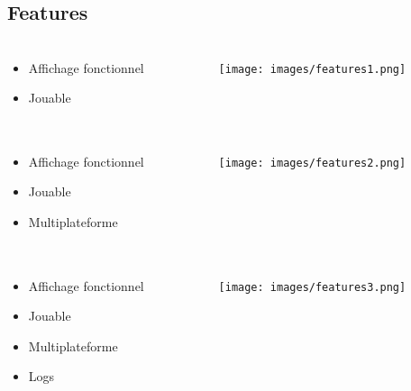 \documentclass{beamer}
\begin{document}
\subsection{Features}
\begin{frame}
	\frametitle{\secname}
  \framesubtitle{\subsecname}
  \begin{columns}[T]
		\begin{column}{.50\textwidth}
      \begin{itemize}
        \item Affichage fonctionnel
        \item Jouable
      \end{itemize}
		\end{column}
    \begin{column}{.50\textwidth}
			\begin{figure}
				\texttt{[image: images/features1.png]}
			\end{figure}
		\end{column}
	\end{columns}
\end{frame}
\begin{frame}
	\frametitle{\secname}
  \framesubtitle{\subsecname}
  \begin{columns}[T]
		\begin{column}{.50\textwidth}
      \begin{itemize}
        \item Affichage fonctionnel
        \item Jouable
        \item Multiplateforme
      \end{itemize}
		\end{column}
    \begin{column}{.50\textwidth}
			\begin{figure}
				\texttt{[image: images/features2.png]}
			\end{figure}
		\end{column}
	\end{columns}
\end{frame}
\begin{frame}
	\frametitle{\secname}
  \framesubtitle{\subsecname}
  \begin{columns}[T]
		\begin{column}{.50\textwidth}
      \begin{itemize}
        \item Affichage fonctionnel
        \item Jouable
        \item Multiplateforme
        \item Logs
      \end{itemize}
		\end{column}
    \begin{column}{.50\textwidth}
			\begin{figure}
				\texttt{[image: images/features3.png]}
			\end{figure}
		\end{column}
	\end{columns}
\end{frame}
\end{document}
